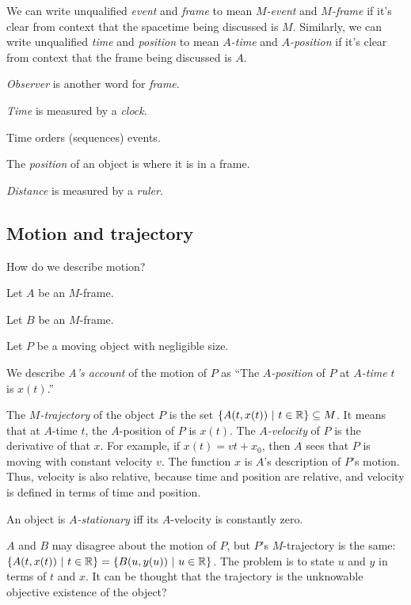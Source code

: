 We can write unqualified \emph{event} and \emph{frame} to mean \emph{\(M\)-event} and \emph{\(M\)-frame}
if it's clear from context that the spacetime being discussed is \(M\).
Similarly, we can write unqualified \emph{time} and \emph{position} to mean \emph{\(A\)-time} and \emph{\(A\)-position}
if it's clear from context that the frame being discussed is \(A\).

\emph{Observer} is another word for \emph{frame}.

\emph{Time} is measured by a \emph{clock}.

Time orders (sequences) events.

The \emph{position} of an object is where it is in a frame.

\emph{Distance} is measured by a \emph{ruler}.


\subsection{Motion and trajectory}

How do we describe motion?

Let \(A\) be an \(M\)-frame.

Let \(B\) be an \(M\)-frame.

Let \(P\) be a moving object with negligible size.

We describe \emph{A's account} of the motion of \(P\) as
\enquote{The \emph{\(A\)-position} of \(P\) at \emph{\(A\)-time} \(t\) is \(x(t)\).}


The \emph{\(M\)-trajectory} of the object \(P\)
is the set \( \{ A(t,x(t)) ~|~ t \in \mathbb{R} \} \subseteq M \).
It means that at \(A\)-time \(t\), the \(A\)-position of \(P\) is \(x(t)\).
The \emph{\(A\)-velocity} of \(P\) is the derivative of that \(x\).
For example, if \(x(t) = vt + x_0\),
then \(A\) sees that \(P\) is moving with constant velocity \(v\).
The function \(x\) is \(A\)'s description of \(P\)'s motion.
Thus, velocity is also relative, because time and position are relative,
and velocity is defined in terms of time and position.

%
%
An object is \emph{\(A\)-stationary} iff its \(A\)-velocity is constantly zero.

\(A\) and \(B\) may disagree about the motion of \(P\), but \(P\)'s \(M\)-trajectory is the same:
\( \{ A(t,x(t)) ~|~ t \in \mathbb{R} \} = \{ B(u,y(u)) ~|~ u \in \mathbb{R} \} \).
The problem is to state \(u\) and \(y\) in terms of \(t\) and \(x\).
It can be thought that the trajectory is the unknowable objective existence of the object?

